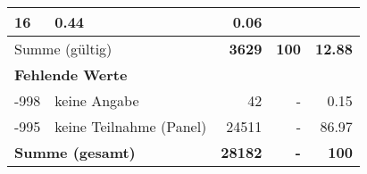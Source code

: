 \begin{longtable}{lXrrr}
       \num{16} &
       \num[round-mode=places,round-precision=2]{0.44} &
         \num[round-mode=places,round-precision=2]{0.06} \\
     \midrule
     \multicolumn{2}{l}{Summe (gültig)} &
       \textbf{\num{3629}} &
     \textbf{100} &
       \textbf{\num[round-mode=places,round-precision=2]{12.88}} \\
     \multicolumn{5}{l}{\textbf{Fehlende Werte}}\\
       -998 &
       keine Angabe &
         \num{42} &
        - &
         \num[round-mode=places,round-precision=2]{0.15} \\
       -995 &
       keine Teilnahme (Panel) &
         \num{24511} &
        - &
         \num[round-mode=places,round-precision=2]{86.97} \\
     \midrule
     \multicolumn{2}{l}{\textbf{Summe (gesamt)}} &
          \textbf{\num{28182}} &
        \textbf{-} &
        \textbf{100} \\
     \bottomrule
     \end{longtable}
     
